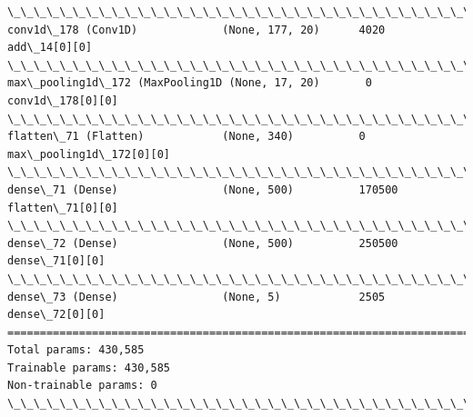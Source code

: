 \documentclass[11pt]{article}
\begin{document}
\begin{Verbatim}[commandchars=\\\{\}]
\_\_\_\_\_\_\_\_\_\_\_\_\_\_\_\_\_\_\_\_\_\_\_\_\_\_\_\_\_\_\_\_\_\_\_\_\_\_\_\_\_\_\_\_\_\_\_\_\_\_\_\_\_\_\_\_\_\_\_\_\_\_\_\_\_\_\_\_\_\_\_\_\_\_\_\_\_\_\_\_\_\_\_\_\_\_\_\_\_\_\_\_\_\_\_\_\_\_
conv1d\_178 (Conv1D)             (None, 177, 20)      4020        add\_14[0][0]                     
\_\_\_\_\_\_\_\_\_\_\_\_\_\_\_\_\_\_\_\_\_\_\_\_\_\_\_\_\_\_\_\_\_\_\_\_\_\_\_\_\_\_\_\_\_\_\_\_\_\_\_\_\_\_\_\_\_\_\_\_\_\_\_\_\_\_\_\_\_\_\_\_\_\_\_\_\_\_\_\_\_\_\_\_\_\_\_\_\_\_\_\_\_\_\_\_\_\_
max\_pooling1d\_172 (MaxPooling1D (None, 17, 20)       0           conv1d\_178[0][0]                 
\_\_\_\_\_\_\_\_\_\_\_\_\_\_\_\_\_\_\_\_\_\_\_\_\_\_\_\_\_\_\_\_\_\_\_\_\_\_\_\_\_\_\_\_\_\_\_\_\_\_\_\_\_\_\_\_\_\_\_\_\_\_\_\_\_\_\_\_\_\_\_\_\_\_\_\_\_\_\_\_\_\_\_\_\_\_\_\_\_\_\_\_\_\_\_\_\_\_
flatten\_71 (Flatten)            (None, 340)          0           max\_pooling1d\_172[0][0]          
\_\_\_\_\_\_\_\_\_\_\_\_\_\_\_\_\_\_\_\_\_\_\_\_\_\_\_\_\_\_\_\_\_\_\_\_\_\_\_\_\_\_\_\_\_\_\_\_\_\_\_\_\_\_\_\_\_\_\_\_\_\_\_\_\_\_\_\_\_\_\_\_\_\_\_\_\_\_\_\_\_\_\_\_\_\_\_\_\_\_\_\_\_\_\_\_\_\_
dense\_71 (Dense)                (None, 500)          170500      flatten\_71[0][0]                 
\_\_\_\_\_\_\_\_\_\_\_\_\_\_\_\_\_\_\_\_\_\_\_\_\_\_\_\_\_\_\_\_\_\_\_\_\_\_\_\_\_\_\_\_\_\_\_\_\_\_\_\_\_\_\_\_\_\_\_\_\_\_\_\_\_\_\_\_\_\_\_\_\_\_\_\_\_\_\_\_\_\_\_\_\_\_\_\_\_\_\_\_\_\_\_\_\_\_
dense\_72 (Dense)                (None, 500)          250500      dense\_71[0][0]                   
\_\_\_\_\_\_\_\_\_\_\_\_\_\_\_\_\_\_\_\_\_\_\_\_\_\_\_\_\_\_\_\_\_\_\_\_\_\_\_\_\_\_\_\_\_\_\_\_\_\_\_\_\_\_\_\_\_\_\_\_\_\_\_\_\_\_\_\_\_\_\_\_\_\_\_\_\_\_\_\_\_\_\_\_\_\_\_\_\_\_\_\_\_\_\_\_\_\_
dense\_73 (Dense)                (None, 5)            2505        dense\_72[0][0]                   
==================================================================================================
Total params: 430,585
Trainable params: 430,585
Non-trainable params: 0
\_\_\_\_\_\_\_\_\_\_\_\_\_\_\_\_\_\_\_\_\_\_\_\_\_\_\_\_\_\_\_\_\_\_\_\_\_\_\_\_\_\_\_\_\_\_\_\_\_\_\_\_\_\_\_\_\_\_\_\_\_\_\_\_\_\_\_\_\_\_\_\_\_\_\_\_\_\_\_\_\_\_\_\_\_\_\_\_\_\_\_\_\_\_\_\_\_\_

    \end{Verbatim}

    \begin{center}
    \end{center}
    { \hspace*{\fill} \\}
    
\end{document}
